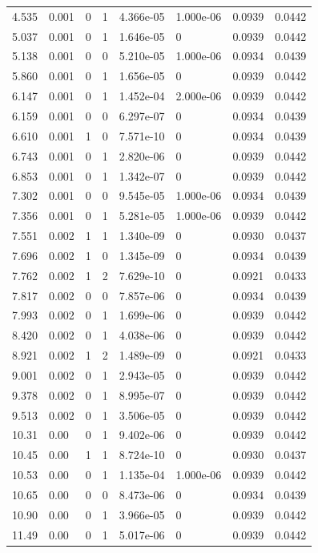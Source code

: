 \documentclass[preview]{standalone}
\begin{document}
{{\begin{tabular}{L{1.2cm}C{1.2cm} C{0.3cm}C{0.5cm} C{1.4cm}C{1.4cm} C{1.4cm}C{1.4cm}}
  4.535  &  0.001  & 0     &  1 &  4.366e-05  & 1.000e-06  & 0.0939 &  0.0442   \\ 
  5.037  &  0.001  & 0     &  1 &  1.646e-05  & 0  & 0.0939 &  0.0442   \\ 
  5.138  &  0.001  & 0     &  0 &  5.210e-05  & 1.000e-06  & 0.0934 &  0.0439   \\ 
  5.860  &  0.001  & 0     &  1 &  1.656e-05  & 0  & 0.0939 &  0.0442   \\ 
  6.147  &  0.001  & 0     &  1 &  1.452e-04  & 2.000e-06  & 0.0939 &  0.0442   \\ 
  6.159  &  0.001  & 0     &  0 &  6.297e-07  & 0  & 0.0934 &  0.0439   \\ 
  6.610  &  0.001  & 1     &  0 &  7.571e-10  & 0  & 0.0934 &  0.0439   \\ 
  6.743  &  0.001  & 0     &  1 &  2.820e-06  & 0  & 0.0939 &  0.0442   \\ 
  6.853  &  0.001  & 0     &  1 &  1.342e-07  & 0  & 0.0939 &  0.0442   \\ 
  7.302  &  0.001  & 0     &  0 &  9.545e-05  & 1.000e-06  & 0.0934 &  0.0439   \\ 
  7.356  &  0.001  & 0     &  1 &  5.281e-05  & 1.000e-06  & 0.0939 &  0.0442   \\ 
  7.551  &  0.002  & 1     &  1 &  1.340e-09  & 0  & 0.0930 &  0.0437   \\ 
  7.696  &  0.002  & 1     &  0 &  1.345e-09  & 0  & 0.0934 &  0.0439   \\ 
  7.762  &  0.002  & 1     &  2 &  7.629e-10  & 0  & 0.0921 &  0.0433   \\ 
  7.817  &  0.002  & 0     &  0 &  7.857e-06  & 0  & 0.0934 &  0.0439   \\ 
  7.993  &  0.002  & 0     &  1 &  1.699e-06  & 0  & 0.0939 &  0.0442   \\ 
  8.420  &  0.002  & 0     &  1 &  4.038e-06  & 0  & 0.0939 &  0.0442   \\ 
  8.921  &  0.002  & 1     &  2 &  1.489e-09  & 0  & 0.0921 &  0.0433   \\ 
  9.001  &  0.002  & 0     &  1 &  2.943e-05  & 0  & 0.0939 &  0.0442   \\ 
  9.378  &  0.002  & 0     &  1 &  8.995e-07  & 0  & 0.0939 &  0.0442   \\ 
  9.513  &  0.002  & 0     &  1 &  3.506e-05  & 0  & 0.0939 &  0.0442   \\ 
  10.31  &  0.00  & 0     &  1 &  9.402e-06  & 0  & 0.0939 &  0.0442   \\ 
  10.45  &  0.00  & 1     &  1 &  8.724e-10  & 0  & 0.0930 &  0.0437   \\ 
  10.53  &  0.00  & 0     &  1 &  1.135e-04  & 1.000e-06  & 0.0939 &  0.0442   \\ 
  10.65  &  0.00  & 0     &  0 &  8.473e-06  & 0  & 0.0934 &  0.0439   \\ 
  10.90  &  0.00  & 0     &  1 &  3.966e-05  & 0  & 0.0939 &  0.0442   \\ 
  11.49  &  0.00  & 0     &  1 &  5.017e-06  & 0  & 0.0939 &  0.0442   \\ 
\hline 
\end{tabular} 

}}
\end{document}
